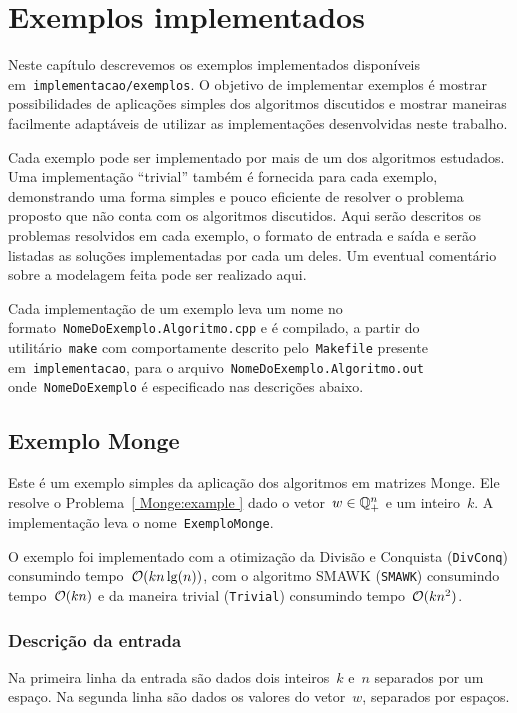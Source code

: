 \chapter{Exemplos implementados}
\label{Exemplos}

Neste capítulo descrevemos os exemplos implementados disponíveis em~\texttt{implementacao/exemplos}. O objetivo de implementar exemplos é mostrar possibilidades de aplicações simples dos algoritmos discutidos e mostrar maneiras facilmente adaptáveis de utilizar as implementações desenvolvidas neste trabalho.

Cada exemplo pode ser implementado por mais de um dos algoritmos estudados. Uma implementação ``trivial'' também é fornecida para cada exemplo, demonstrando uma forma simples e pouco eficiente de resolver o problema proposto que não conta com os algoritmos discutidos. Aqui serão descritos os problemas resolvidos em cada exemplo, o formato de entrada e saída e serão listadas as soluções implementadas por cada um deles. Um eventual comentário sobre a modelagem feita pode ser realizado aqui.

Cada implementação de um exemplo leva um nome no formato~\texttt{NomeDoExemplo.Algoritmo.cpp} e é compilado, a partir do utilitário~\texttt{make} com comportamente descrito pelo~\texttt{Makefile} presente em~\texttt{implementacao}, para o arquivo~\texttt{NomeDoExemplo.Algoritmo.out} onde~\texttt{NomeDoExemplo} é especificado nas descrições abaixo.


\section{Exemplo Monge} \label{ExemploMonge}

Este é um exemplo simples da aplicação dos algoritmos em matrizes Monge. Ele resolve o Problema~\ref{ Monge:example } dado o vetor~$w \in \mathbb{Q}^{n}_+$ e um inteiro~$k$. A implementação leva o nome~\texttt{ExemploMonge}.

O exemplo foi implementado com a otimização da Divisão e Conquista (\texttt{DivConq}) consumindo tempo~$\mathcal{O}(kn\lg(n))$, com o algoritmo SMAWK (\texttt{SMAWK}) consumindo tempo~$\mathcal{O}(kn)$ e da maneira trivial (\texttt{Trivial}) consumindo tempo~$\mathcal{O}(kn^2)$.

\subsection*{Descrição da entrada}
Na primeira linha da entrada são dados dois inteiros~$k$ e~$n$ separados por um espaço. Na segunda linha são dados os valores do vetor~$w$, separados por espaços.


